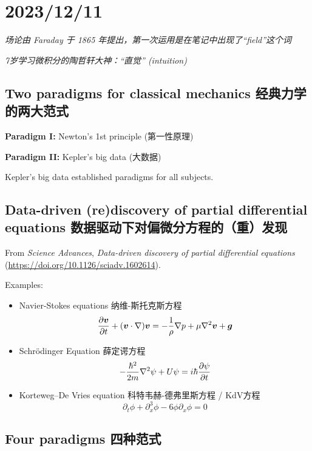 \chapter{2023/12/11}\label{20231211}

\emph{场论由 Faraday 于 1865
年提出，第一次运用是在笔记中出现了``field''这个词}

\emph{7岁学习微积分的陶哲轩大神：``直觉'' (intuition)}

\section{Two paradigms for classical mechanics
经典力学的两大范式}\label{two-paradigms-for-classical-mechanics-ux7ecfux5178ux529bux5b66ux7684ux4e24ux5927ux8303ux5f0f}

\textbf{Paradigm I:} Newton's 1st principle (第一性原理)

\textbf{Paradigm II:} Kepler's big data (大数据)

Kepler's big data established paradigms for all subjects.

\section{Data-driven (re)discovery of partial differential equations
数据驱动下对偏微分方程的（重）发现}\label{data-driven-rediscovery-of-partial-differential-equations-ux6570ux636eux9a71ux52a8ux4e0bux5bf9ux504fux5faeux5206ux65b9ux7a0bux7684ux91cdux53d1ux73b0}

From \emph{Science Advances}, \emph{Data-driven discovery of partial differential equations} (\url{https://doi.org/10.1126/sciadv.1602614}).

Examples:
\begin{itemize}
    \tightlist{}
    \item Navier-Stokes equations 纳维-斯托克斯方程 \[ {\partial \boldsymbol v \over \partial t} +(\boldsymbol v \cdot \nabla) \boldsymbol v = - {1 \over \rho} \nabla p + \mu \nabla^2 \boldsymbol v + \boldsymbol g\]
    \item Schrödinger Equation 薛定谔方程
    \[-{ \hbar^2 \over 2m } \nabla ^2 \psi + U \psi =i\hbar {\partial \psi \over \partial t}\]
    \item Korteweg--De Vries equation 科特韦赫-德弗里斯方程 / KdV方程
    \[\partial_t \phi + \partial^3_x \phi - 6 \phi \partial_x \phi =0\]
\end{itemize}

\section{Four paradigms
四种范式}\label{four-paradigms-ux56dbux79cdux8303ux5f0f}

